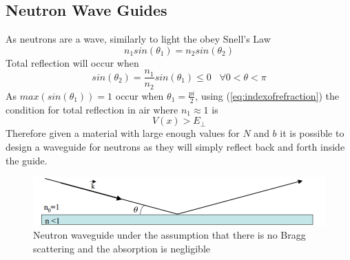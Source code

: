\subsection{Neutron Wave Guides}
\label{sec:waveguide}
As neutrons are a wave, similarly to light the obey Snell's Law 
\begin{equation}
n_1sin(\theta_1) = n_2sin(\theta_2)
\label{eq:snellslaw}
\end{equation}
Total reflection will occur when 
$$sin(\theta_2)= \frac{n_1}{n_2}sin(\theta_1)\le 0 \,\,\,\,\, \forall 0<\theta<\pi$$
As $max(sin(\theta_1))=1$ occur when $\theta_1=\frac{pi}{2}$, using (\ref{eq:indexofrefraction}) the condition for total reflection in air where $n_1\approx1$ is  
\begin{equation}
V(x)> E_\perp
\label{eq:interalreflection}
\end{equation}
Therefore given a material with large enough values for $N$ and $b$ it is possible to design a waveguide for neutrons as they will simply reflect back and forth inside the guide. 

\begin{figure}[ht!]
\centering
\includegraphics[width=\textwidth]{Figures/waveguide.png}
\caption{Neutron waveguide under the assumption that there is no Bragg scattering and the absorption is negligible \cite{waveguide} }
\label{fig:waveguide}
\end{figure}
